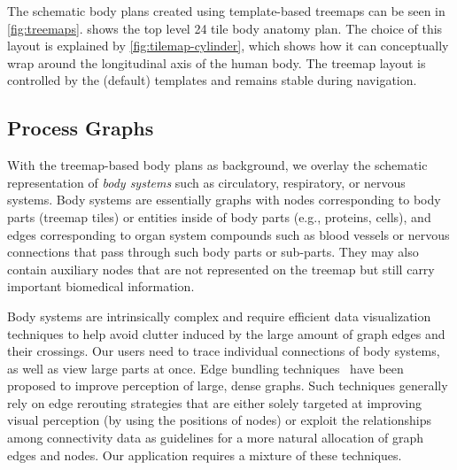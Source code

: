
The schematic body plans created using template-based treemaps can be seen in \cref{fig:treemaps}.  shows the top level 24 tile body anatomy plan. The choice of this layout is explained by \cref{fig:tilemap-cylinder}, which shows how it can conceptually wrap around the longitudinal axis of the human body. The treemap layout is controlled by the (default) templates and remains stable during navigation.


\subsection{Process Graphs} %
\label{sec:process-graphs}

With the treemap-based body plans as background, we overlay the schematic representation of \emph{body systems} such as circulatory, respiratory, or nervous systems. Body systems are essentially graphs with nodes corresponding to body parts (treemap tiles) or entities inside of body parts (e.g., proteins, cells), and edges corresponding to organ system compounds such as blood vessels or nervous connections that pass through such body parts or sub-parts.
They may also contain auxiliary nodes that are not represented on the treemap but still carry important biomedical information.

Body systems are intrinsically complex and require efficient data visualization techniques to help avoid clutter induced by the large amount of graph edges and their crossings. Our users need to trace individual connections of body systems, as well as view large parts at once. Edge bundling techniques~\cite{Hol06,GHN+11,HET12} have been proposed to improve perception of large, dense graphs. Such techniques generally rely on edge rerouting strategies that are either solely targeted at improving visual perception (by using the positions of nodes) or exploit the relationships among connectivity data as guidelines for a more natural allocation of graph edges and nodes. Our application requires a mixture of these techniques.

